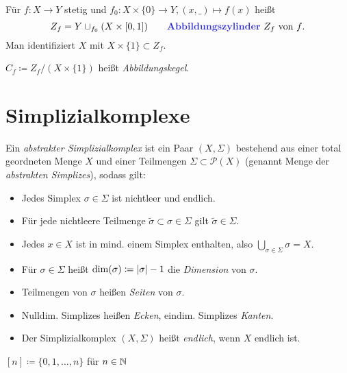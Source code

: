 \documentclass{cheat-sheet}
\newcommand{\Pow}{\mathcal{P}} %
\begin{document}
\begin{defn}
  Für $f : X \to Y$ stetig und $f_0 : X \times \{ 0 \} \to Y, (x, \_) \mapsto f(x)$ heißt
  \[
    Z_f = Y \cup_{f_0} (X \times \I)
    \qquad \text{\emph{Abbildungszylinder} $Z_f$ von $f$.}
  \]
  Man identifiziert $X$ mit $X \times \{ 1 \} \subset Z_f$.
\end{defn}

\begin{defn}
  $C_f \coloneqq Z_f / (X \times \{ 1 \})$ heißt \emph{Abbildungskegel}.
\end{defn}

\section{Simplizialkomplexe}

\begin{defn}
  Ein \emph{abstrakter Simplizialkomplex} ist ein Paar $(X, \Sigma)$ bestehend aus einer total geordneten Menge $X$ und einer Teilmengen $\Sigma \subset \Pow(X)$ (genannt Menge der \emph{abstrakten Simplizes}), sodass gilt:
  \begin{itemize}
    \item Jedes Simplex $\sigma \in \Sigma$ ist nichtleer und endlich.
    \item Für jede nichtleere Teilmenge $\tilde{\sigma} \subset \sigma \in \Sigma$ gilt $\tilde{\sigma} \in \Sigma$.
    \item Jedes $x \!\in\! X$ ist in mind. einem Simplex enthalten, also $\bigcup_{\sigma \in \Sigma} \! \sigma = X$.
  \end{itemize}
\end{defn}

\begin{defn}
  \begin{itemize}
    \item Für $\sigma \in \Sigma$ heißt $\dim(\sigma) \coloneqq \lvert\sigma\rvert - 1$ die \emph{Dimension} von $\sigma$.
    \item Teilmengen von $\sigma$ heißen \emph{Seiten} von $\sigma$.
    \item Nulldim. Simplizes heißen \emph{Ecken}, eindim. Simplizes \emph{Kanten}.
    \item Der Simplizialkomplex $(X, \Sigma)$ heißt \emph{endlich}, wenn $X$ endlich ist.
  \end{itemize}
\end{defn}

\begin{nota}
  $[n] \coloneqq \{ 0, 1, \ldots, n \}$ für $n \in \mathbb{N}$
\end{nota}
\end{document}
